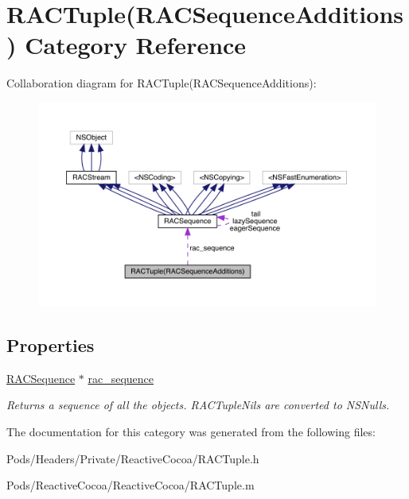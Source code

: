 \hypertarget{category_r_a_c_tuple_07_r_a_c_sequence_additions_08}{}\section{R\+A\+C\+Tuple(R\+A\+C\+Sequence\+Additions) Category Reference}
\label{category_r_a_c_tuple_07_r_a_c_sequence_additions_08}


Collaboration diagram for R\+A\+C\+Tuple(R\+A\+C\+Sequence\+Additions)\+:\nopagebreak
\begin{figure}[H]
\begin{center}
\leavevmode
\includegraphics[width=350pt]{category_r_a_c_tuple_07_r_a_c_sequence_additions_08__coll__graph}
\end{center}
\end{figure}
\subsection*{Properties}
\begin{DoxyCompactItemize}
\item 
\mbox{\label{category_r_a_c_tuple_07_r_a_c_sequence_additions_08_a6ddee991ca6d808b0393e273a1f2576d}} 
\mbox{\hyperlink{interface_r_a_c_sequence}{R\+A\+C\+Sequence}} $\ast$ \mbox{\hyperlink{category_r_a_c_tuple_07_r_a_c_sequence_additions_08_a6ddee991ca6d808b0393e273a1f2576d}{rac\+\_\+sequence}}
\begin{DoxyCompactList}\small\item\em Returns a sequence of all the objects. R\+A\+C\+Tuple\+Nils are converted to N\+S\+Nulls. \end{DoxyCompactList}\end{DoxyCompactItemize}


The documentation for this category was generated from the following files\+:\begin{DoxyCompactItemize}
\item 
Pods/\+Headers/\+Private/\+Reactive\+Cocoa/R\+A\+C\+Tuple.\+h\item 
Pods/\+Reactive\+Cocoa/\+Reactive\+Cocoa/R\+A\+C\+Tuple.\+m\end{DoxyCompactItemize}

